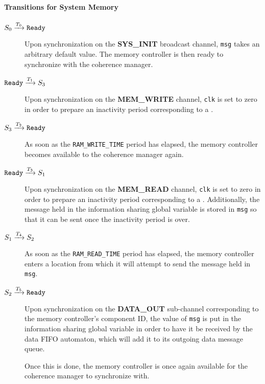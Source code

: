 \paragraph{Transitions for System Memory}
\begin{description}
\item[$S_0 \xrightarrow[]{T_{0}} \texttt{Ready}$]
   Upon synchronization on the \textbf{SYS\_INIT} broadcast channel,
   \lstinline!msg! takes an arbitrary default value. The memory controller is
   then ready to synchronize with the coherence manager.

\item[$\texttt{Ready} \xrightarrow[]{T_{1}} S_3$]
   Upon synchronization on the \textbf{MEM\_WRITE} channel, \lstinline!clk!
   is set to zero in order to prepare an inactivity period corresponding to
   a \writeact{}.

\item[$S_3 \xrightarrow[]{T_{2}} \texttt{Ready}$]
   As soon as the \lstinline!RAM_WRITE_TIME! period has elapsed, the memory
   controller becomes available to the coherence manager again.

\item[$\texttt{Ready} \xrightarrow[]{T_{3}} S_1$]
   Upon synchronization on the \textbf{MEM\_READ} channel, \lstinline!clk!
   is set to zero in order to prepare an inactivity period corresponding to
   a \readact{}. Additionally, the message held in the information sharing
   global variable is stored in \lstinline!msg! so that it can be sent once the
   inactivity period is over.

\item[$S_1 \xrightarrow[]{T_{4}} S_2$]
   As soon as the \lstinline!RAM_READ_TIME! period has elapsed, the memory
   controller enters a location from which it will attempt to send the message
   held in \lstinline!msg!.

\item[$S_2 \xrightarrow[]{T_{5}} \texttt{Ready}$]
   Upon synchronization on the \textbf{DATA\_OUT} sub-channel corresponding to
   the memory controller's component ID, the value of \lstinline!msg! is put in
   the information sharing global variable in order to have it be received by
   the data FIFO automaton, which will add it to its outgoing data message
   queue.

   Once this is done, the memory controller is once again available for the
   coherence manager to synchronize with.
\end{description}
